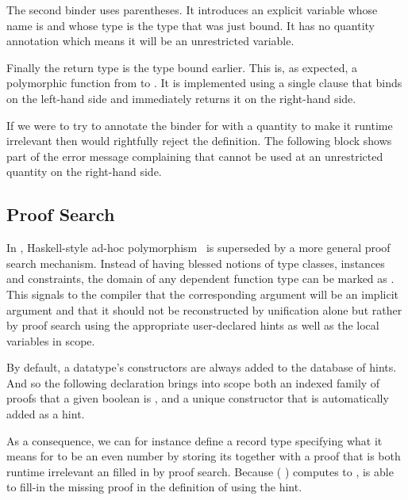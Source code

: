 The second binder uses parentheses. It introduces an explicit variable whose name
is  and whose type is the type  that was just bound. It has
no quantity annotation which means it will be an unrestricted variable.

Finally the return type is the type  bound earlier. This is, as expected,
a polymorphic function from  to . It is implemented using
a single clause that binds  on the left-hand side and immediately returns
it on the right-hand side.


If we were to try to annotate the binder for  with a 
quantity to make it runtime irrelevant then \idris{} would
rightfully reject the definition.
%
The following  block shows part of the error message complaining
that  cannot be used at an unrestricted quantity on the right-hand side.




\subsection{Proof Search}\label{sec:proofsearch}

In \idris{}, Haskell-style ad-hoc polymorphism~\cite{DBLP:conf/popl/WadlerB89}
is superseded by a more general proof search mechanism.
%
Instead of having blessed notions of type classes, instances and constraints,
the domain of any dependent function type can be marked as .
%
This signals to the compiler that the corresponding argument will be an implicit
argument and that it should not be reconstructed by unification alone but rather by
proof search using the appropriate user-declared hints as well as the local
variables in scope.

By default, a datatype's constructors are always added to the database of hints.
And so the following declaration brings into scope both an indexed family
 of proofs that a given boolean is , and a unique
constructor  that is automatically added as a hint.


As a consequence, we can for instance define a record type specifying what it
means for  to be an even number by storing its 
together with a proof that is both runtime irrelevant an filled in by proof search.
%
Because ( \IdrisFunction{*}  \IdrisFunction{==} )
computes to , \idris{} is able to fill-in the missing proof in the
definition of  using the  hint.

